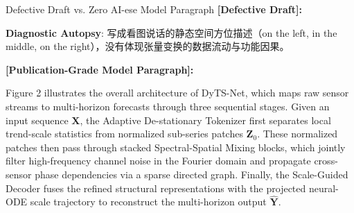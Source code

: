 \begin{ExampleBox}{Defective Draft vs. Zero AI-ese Model Paragraph}
\textbf{\color{TargetHighlight}[Defective Draft]:}\par
{}\par\vspace{4pt}
\textbf{Diagnostic Autopsy}: 写成看图说话的静态空间方位描述（on the left, in the middle, on the right），没有体现张量变换的数据流动与功能因果。\par\vspace{6pt}
\textbf{\color{AcadNavy}[Publication-Grade Model Paragraph]:}\par
Figure 2 illustrates the overall architecture of DyTS-Net, which maps raw sensor streams to multi-horizon forecasts through three sequential stages. Given an input sequence $\mathbf{X}$, the Adaptive De-stationary Tokenizer first separates local trend-scale statistics from normalized sub-series patches $\mathbf{Z}_0$. These normalized patches then pass through stacked Spectral-Spatial Mixing blocks, which jointly filter high-frequency channel noise in the Fourier domain and propagate cross-sensor phase dependencies via a sparse directed graph. Finally, the Scale-Guided Decoder fuses the refined structural representations with the projected neural-ODE scale trajectory to reconstruct the multi-horizon output $\hat{\mathbf{Y}}$.
\end{ExampleBox}
